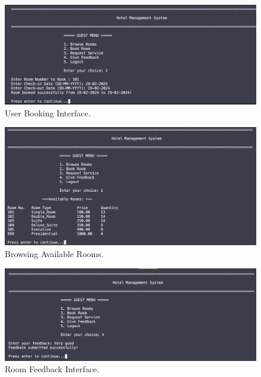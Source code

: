 \documentclass[12pt,a4paper]{article}
\begin{document}
\begin{figure}[!htbp]
    \centering
    \includegraphics[width=\linewidth]{booking.png} %
    \caption{User Booking Interface.}
\end{figure}

\begin{figure}[!htbp]
    \centering
    \includegraphics[width=\linewidth]{browse.png} %
    \caption{Browsing Available Rooms.}
\end{figure}

\begin{figure}[!htbp]
    \centering
    \includegraphics[width=\linewidth]{feedback.png} %
    \caption{Room Feedback Interface.}
\end{figure}
\clearpage
\end{document}
